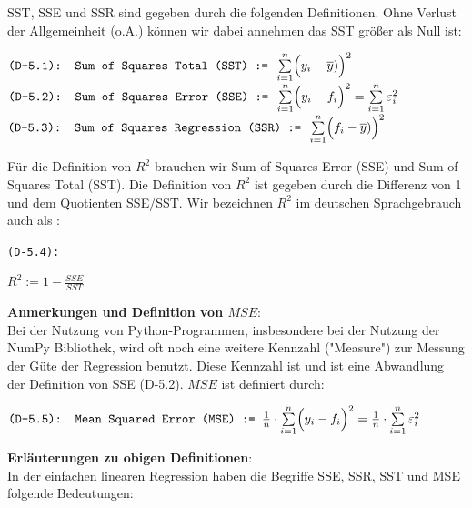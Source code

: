 \documentclass[12pt]{article}
\begin{document}
%
SST, SSE und SSR sind gegeben durch die folgenden Definitionen. Ohne Verlust der Allgemeinheit (o.A.) können wir dabei annehmen das SST größer als Null ist:
\begin{center}
$ \texttt{(D-5.1): Sum of Squares Total (SST) := } \sum\limits_{i=1}^n \Bigl(y_i - \overline{y})\Bigr)^2 $ 
$ \texttt{(D-5.2): Sum of Squares Error (SSE) := } \sum\limits_{i=1}^n \Bigl(y_i - f_i\Bigr)^2 = \sum\limits_{i=1}^n \varepsilon_i^2 $ 
$ \texttt{(D-5.3): Sum of Squares Regression (SSR) := } \sum\limits_{i=1}^n \Bigl(f_i - \overline{y})\Bigr)^2 $  
\end{center}
% 
Für die Definition von $R^2$ brauchen wir Sum of Squares Error (SSE) und Sum of Squares Total (SST). Die Definition von $R^2$ ist gegeben durch die Differenz von 1 und dem Quotienten SSE/SST. Wir bezeichnen $R^2$ im deutschen Sprachgebrauch auch als {\color{blue}{"Bestimmtheitsgmaß"}}: \\
\begin{center}
\texttt{(D-5.4):}
\begin{Large}  
\textbf{$ R^2 := 1 - \frac{SSE}{SST} $} \\[0.8cm]
\end{Large}   
\end{center}
% 
\textbf{Anmerkungen und Definition von $MSE$}:\\[0.2cm]
Bei der Nutzung von Python-Programmen, insbesondere bei der Nutzung der NumPy Bibliothek, wird oft noch eine weitere Kennzahl ("Measure") zur Messung der Güte der Regression benutzt. Diese Kennzahl ist  {\color{blue}{"Mean Squared Error" $(MSE)$}}  und ist eine Abwandlung der Definition von SSE (D-5.2). $ MSE$ ist definiert durch:
\begin{center}
$ \texttt{(D-5.5): Mean Squared Error (MSE) := } \frac{1}{n} \cdot \sum\limits_{i=1}^n \Bigl( y_i - f_i \Bigr)^2 = \frac{1}{n} \cdot \sum\limits_{i=1}^n \varepsilon_i^2 $ \\
\end{center} 
%
\textbf{Erläuterungen zu obigen Definitionen}:\\[0.3 cm]
%
In der einfachen linearen Regression haben die Begriffe SSE, SSR, SST und MSE folgende Bedeutungen:
\end{document}
